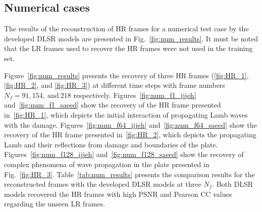 \subsection{Numerical cases}
The results of the reconstruction of HR frames for a numerical test case by the developed DLSR models are presented in Fig.~\ref{fig:num_results}.
It must be noted that the LR frames used to recover the HR frames were not used in the training set.

Figure~\ref{fig:num_results} presents the recovery of three HR frames (\ref{fig:HR_1}, \ref{fig:HR_2}, and \ref{fig:HR_3}) at different time steps with frame numbers \(N_f=91, 154,\ \text{and}\ 218\) respectively.
Figures~\ref{fig:num_f1_ijjeh} and~\ref{fig:num_f1_saeed} show the recovery of the HR frame presented in~\ref{fig:HR_1}, which depicts the initial interaction of propagating Lamb waves with the damage.
Figures~\ref{fig:num_f64_ijjeh} and~\ref{fig:num_f64_saeed} show the recovery of the HR frame presented in~\ref{fig:HR_2}, which depicts the propagating Lamb and their reflections from damage and boundaries of the plate.
Figures~\ref{fig:num_f128_ijjeh} and~\ref{fig:num_f128_saeed} show the recovery of complex phenomena of wave propagation in the plate presented in Fig.~\ref{fig:HR_3}.
Table~\ref{tab:num_results} presents the comparison results for the reconstructed frames with the developed DLSR models at three $N_f$.
Both DLSR models recovered the HR frames with high PSNR and Pearson CC values regarding the unseen LR frames.
